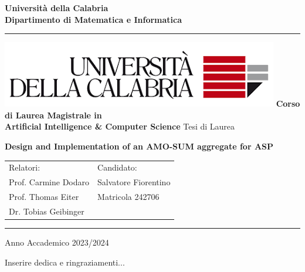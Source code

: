 \documentclass[a4paper,12pt,oneside]{book}
\newenvironment{dedication}
  {\clearpage           %
   \thispagestyle{empty}%
   \vspace*{\stretch{1}}%
   \itshape             %
   \raggedleft          %
  }
   {\par %
   \vspace{\stretch{3}} %
   \clearpage           %
  }
\begin{document}
\begin{titlepage}
\begin{center}
\textbf{\LARGE Universit\`a della Calabria}\\
\textbf{Dipartimento di Matematica e Informatica}\\
\vskip 6pt
\hrule
\vskip 8pt
\includegraphics{logo.png}
\vskip 8pt
\textbf{Corso di Laurea Magistrale in\\ Artificial Intelligence \& Computer Science}
\vskip 32pt
Tesi di Laurea

\vskip 70pt
{ \huge \bfseries Design and Implementation of an AMO-SUM aggregate for ASP}\\[0.4cm]
\vskip 120pt

\begin{tabular}{p{8cm}p{8cm}}
Relatori: & Candidato:\\
Prof. Carmine Dodaro & Salvatore Fiorentino\\
Prof. Thomas Eiter & Matricola 242706\\
Dr. Tobias Geibinger & 
\end{tabular}

\vskip 60pt
\hrule
\vskip 6pt
Anno Accademico 2023/2024
\vfill
\end{center}
\end{titlepage}


\begin{dedication}
Inserire dedica e ringraziamenti...
\end{dedication}




\tableofcontents







\newpage
\printbibliography
\end{document}

